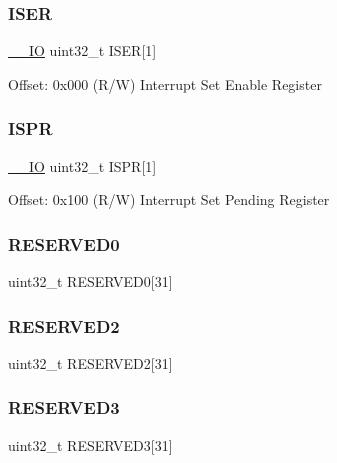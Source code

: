 \subsubsection{\texorpdfstring{ISER}{ISER}}
{\footnotesize\ttfamily \mbox{\hyperlink{core__cm0plus_8h_aec43007d9998a0a0e01faede4133d6be}{\+\_\+\+\_\+\+IO}} uint32\+\_\+t I\+S\+ER\mbox{[}1\mbox{]}}

Offset\+: 0x000 (R/W) Interrupt Set Enable Register \mbox{\label{struct_n_v_i_c___type_a0ed5d4d6b2105c9235639256bf6f94b8}} 
\subsubsection{\texorpdfstring{ISPR}{ISPR}}
{\footnotesize\ttfamily \mbox{\hyperlink{core__cm0plus_8h_aec43007d9998a0a0e01faede4133d6be}{\+\_\+\+\_\+\+IO}} uint32\+\_\+t I\+S\+PR\mbox{[}1\mbox{]}}

Offset\+: 0x100 (R/W) Interrupt Set Pending Register \mbox{\label{struct_n_v_i_c___type_a03c9ef255da9ec52ad195ff310267707}} 
\subsubsection{\texorpdfstring{RESERVED0}{RESERVED0}}
{\footnotesize\ttfamily uint32\+\_\+t R\+E\+S\+E\+R\+V\+E\+D0\mbox{[}31\mbox{]}}

\mbox{\label{struct_n_v_i_c___type_aaade1cfbe11f972bd8172705a64e761e}} 
\subsubsection{\texorpdfstring{RESERVED2}{RESERVED2}}
{\footnotesize\ttfamily uint32\+\_\+t R\+E\+S\+E\+R\+V\+E\+D2\mbox{[}31\mbox{]}}

\mbox{\label{struct_n_v_i_c___type_a9b8fd6d6abdb53c9c474cd1857906546}} 
\subsubsection{\texorpdfstring{RESERVED3}{RESERVED3}}
{\footnotesize\ttfamily uint32\+\_\+t R\+E\+S\+E\+R\+V\+E\+D3\mbox{[}31\mbox{]}}

